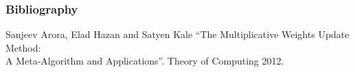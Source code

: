 \documentclass{beamer}
\begin{document}
\begin{frame}
    \frametitle{Bibliography}

    \begin{thebibliography}{9}
         Sanjeev Arora, Elad Hazan and Satyen Kale \newblock
            ``The Multiplicative Weights Update Method:\\ A Meta-Algorithm and
            Applications''. \newblock Theory of Computing 2012.
    \end{thebibliography}
\end{frame}
\end{document}
